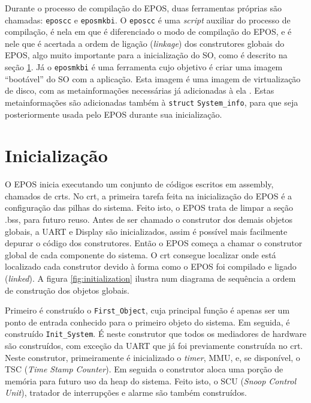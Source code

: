 
Durante o processo de compilação do EPOS, duas ferramentas próprias são chamadas: \verb=eposcc= e \verb=eposmkbi=. O \verb=eposcc= é uma \emph{script} auxiliar do processo de compilação, é nela em que é diferenciado o modo de compilação do EPOS, e é nele que é acertada a ordem de ligação (\emph{linkage}) dos construtores globais do EPOS, algo muito importante para a inicialização do SO, como é descrito na seção \ref{sec:inicializacao}.
Já o \verb=eposmkbi= é uma ferramenta cujo objetivo é criar uma imagem ``bootável'' do SO com a aplicação. Esta imagem é uma imagem de virtualização de disco, com as metainformações necessárias já adicionadas à ela \cite{tarcisio}. Estas metainformações são adicionadas também à \verb=struct= \verb+System_info+, para que seja posteriormente usada pelo EPOS durante sua inicialização.



\section{Inicialização}
\label{sec:inicializacao}
O EPOS inicia executando um conjunto de códigos escritos em assembly, chamados de crts.
No crt, a primeira tarefa feita na inicialização do EPOS é a configuração das pilhas do sistema. Feito isto, o EPOS trata de limpar a seção .bss, para futuro reuso.
Antes de ser chamado o construtor dos demais objetos globais, a UART e Display são inicializados, assim é possível mais facilmente depurar o código dos construtores.
Então o EPOS começa a chamar o construtor global de cada componente do sistema. O crt consegue localizar onde está localizado cada construtor devido à forma como o EPOS foi compilado e ligado (\emph{linked}). A figura \ref{fig:initialization} ilustra num diagrama de sequência a ordem de construção dos objetos globais.


Primeiro é construído o \verb+First_Object+, cuja principal função é apenas ser um ponto de entrada conhecido para o primeiro objeto do sistema.
Em seguida, é construído \verb+Init_System+. É neste construtor que todos os mediadores de hardware são construídos, com exceção da UART que já foi previamente construída no crt. Neste construtor, primeiramente é inicializado o \emph{timer}, MMU, e, se disponível, o TSC (\emph{Time Stamp Counter}). Em seguida o construtor aloca uma porção de memória para futuro uso da heap do sistema. Feito isto, o SCU (\emph{Snoop Control Unit}), tratador de interrupções e alarme são também construídos.

